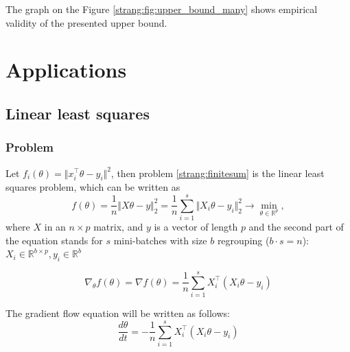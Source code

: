 \documentclass{article}
\begin{document}
The graph on the Figure \ref{strang:fig:upper_bound_many} shows empirical validity of the presented upper bound.



\section{Applications}
\subsection{Linear least squares}
\subsubsection{Problem}
Let $f_i(\theta) = \Vert x_i^{\top} \theta - y_i \Vert^2$, then problem \eqref{strang:finitesum} is the linear least squares problem, which can be written as
\begin{equation}\label{strang:LLS}
   f(\theta) = \frac{1}{n}\Vert X \theta - y \Vert_2^2  = \frac{1}{n}\sum\limits_{i=1}^s\Vert X_i \theta - y_i \Vert_2^2\to \min_{\theta \in \mathbb{R}^p},
\end{equation}
where $X$ in an $n \times p$ matrix, and $y$ is a vector of length $p$ and the second part of the equation stands for $s$ mini-batches with size $b$ regrouping ($b \cdot s = n$): $X_i \in \mathbb{R}^{b \times p}, y_i \in \mathbb{R}^{b}$

\begin{equation}\label{strang:LLS_grad}
\nabla_\theta f(\theta) = \nabla f(\theta) = \frac{1}{n}\sum\limits_{i=1}^s X_i^\top( X_i \theta - y_i)
\end{equation}

The gradient flow equation will be written as follows:
\begin{equation}\label{strang:LLS_GF}
\frac{d \theta}{d t} = - \frac{1}{n}\sum\limits_{i=1}^s X_i^\top( X_i \theta - y_i)
\end{equation}
\end{document}
